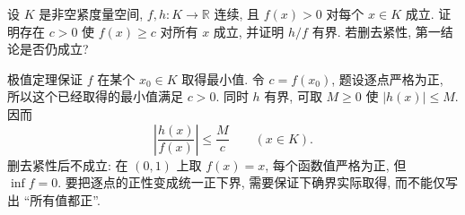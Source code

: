 \begin{exercise}
\label{ch:compact:ex-positive-function}
设 $K$ 是非空紧度量空间, $f,h:K\to\mathbb{R}$ 连续, 且 $f(x)>0$ 对每个 $x\in K$ 成立. 证明存在 $c>0$ 使 $f(x)\geq c$ 对所有 $x$ 成立, 并证明 $h/f$ 有界. 若删去紧性, 第一结论是否仍成立?
\end{exercise}
\begin{solution}
极值定理保证 $f$ 在某个 $x_0\in K$ 取得最小值. 令 $c=f(x_0)$, 题设逐点严格为正, 所以这个已经取得的最小值满足 $c>0$. 同时 $h$ 有界, 可取 $M\geq0$ 使 $|h(x)|\leq M$. 因而
\[
 \left|\frac{h(x)}{f(x)}\right|\leq\frac Mc
 \qquad(x\in K).
\]
删去紧性后不成立: 在 $(0,1)$ 上取 $f(x)=x$, 每个函数值严格为正, 但 $\inf f=0$. 要把逐点的正性变成统一正下界, 需要保证下确界实际取得, 而不能仅写出 ``所有值都正''.
\end{solution}
